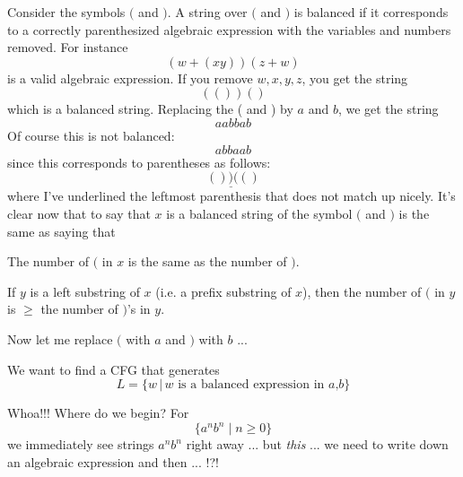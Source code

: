 \begin{eg}
Consider the symbols $($ and $)$.
A string over $($ and $)$ is balanced if it corresponds to a correctly
parenthesized algebraic expression with the variables and numbers removed.
For instance 
\[
(w + (xy))(z + w)
\] 
is a valid algebraic expression.
If you remove $w, x, y, z$, you get the string
\[
(())()
\] 
which is a balanced string.
Replacing the ( and ) by $a$ and $b$, we get the string
\[
aabbab
\]
Of course this is not balanced:
\[
abbaab
\]
since this corresponds to parentheses as follows:
\[
()\underline{)}(()
\]
where I've underlined the leftmost parenthesis that does not match up nicely.
It's clear now that to say that $x$ is a balanced string of the symbol
$($ and $)$ is the same as saying that
\begin{tightlist}
\item The number of $($ in $x$ is the same as the number of $)$.
\item If $y$ is a left substring of $x$ (i.e. a prefix substring of $x$),
then the number of $($ in $y$ is $\geq$ the number of $)$'s in $y$. 
\end{tightlist}

Now let me replace $($ with $a$ and $)$ with $b$ ...

We want to find a CFG that generates
\[
L = \{w \,|\,w \text{ is a balanced expression in $a$,$b$} \}
\]

Whoa!!! Where do we begin? For 
\[
\{a^nb^n \mid n \geq 0 \}
\]
we immediately see strings $a^n b^n$ right away ... but \textit{ this} ... we need to write down an algebraic
expression and then ... !?!


\end{eg}

